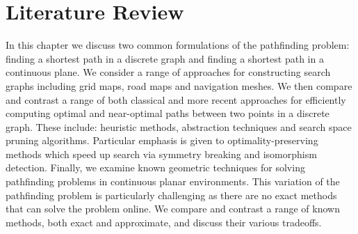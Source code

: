 \chapter{Literature Review}
\label{cha::lit::abstract}
In this chapter we discuss two common formulations of the pathfinding problem: 
finding a shortest path in a discrete graph and finding a shortest path in a 
continuous plane.
We consider a range of approaches for constructing search graphs including grid
maps, road maps and navigation meshes.  We then compare and contrast a range of
both classical and more recent approaches for efficiently computing optimal and
near-optimal paths between two points in a discrete graph.  These include:
heuristic methods, abstraction techniques and search space pruning algorithms.
Particular emphasis is given to optimality-preserving methods which speed up
search via symmetry breaking and isomorphism detection.
Finally, we examine known geometric techniques for solving pathfinding problems
in continuous planar environments.  This variation of the pathfinding problem is
particularly challenging as there are no exact methods that can solve the
problem online.  We compare and contrast a range of known methods, both exact
and approximate, and discuss their various tradeoffs.


